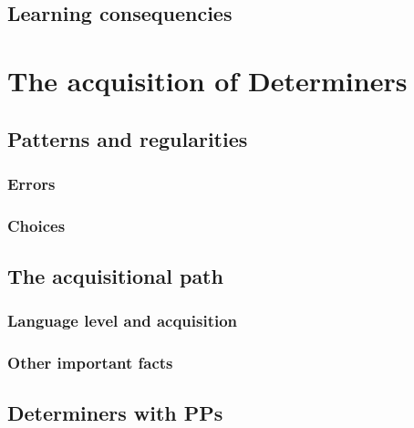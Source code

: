 \documentclass[
  a4paper,
  twoside,
  12pt,
  chapterprefix=false,
  bibliography=totocnumbered,
  listof=flat]{scrbook}
\begin{document}
\hypertarget{learning-consequencies}{%
\subsection{Learning consequencies}\label{learning-consequencies}}

\hypertarget{the-acquisition-of-determiners}{%
\section{The acquisition of Determiners}\label{the-acquisition-of-determiners}}

\hypertarget{patterns-and-regularities}{%
\subsection{Patterns and regularities}\label{patterns-and-regularities}}

\hypertarget{errors}{%
\subsubsection{Errors}\label{errors}}

\hypertarget{choices}{%
\subsubsection{Choices}\label{choices}}

\hypertarget{the-acquisitional-path}{%
\subsection{The acquisitional path}\label{the-acquisitional-path}}

\hypertarget{language-level-and-acquisition}{%
\subsubsection{Language level and acquisition}\label{language-level-and-acquisition}}

\hypertarget{other-important-facts}{%
\subsubsection{Other important facts}\label{other-important-facts}}

\hypertarget{determiners-with-pps}{%
\subsection{Determiners with PPs}\label{determiners-with-pps}}
\end{document}
